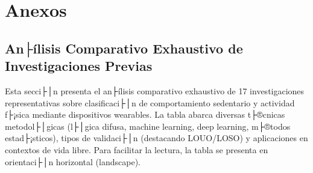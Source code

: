 ﻿%

\chapter*{Anexos}


\section{An├ílisis Comparativo Exhaustivo de Investigaciones Previas}
\label{sec:anexo_tabla_completa}

Esta secci├│n presenta el an├ílisis comparativo exhaustivo de 17 investigaciones representativas sobre clasificaci├│n de comportamiento sedentario y actividad f├¡sica mediante dispositivos wearables. La tabla abarca diversas t├®cnicas metodol├│gicas (l├│gica difusa, machine learning, deep learning, m├®todos estad├¡sticos), tipos de validaci├│n (destacando LOUO/LOSO) y aplicaciones en contextos de vida libre. Para facilitar la lectura, la tabla se presenta en orientaci├│n horizontal (landscape).

